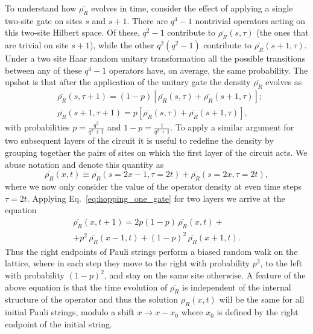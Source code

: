 \documentclass[aps,prb,twocolumn,superscriptaddress]{revtex4-1}
\begin{document}
To understand how $\overline{\rho_R}$ evolves in time, consider the effect of applying a single two-site gate on sites $s$ and $s+1$. There are $q^4-1$ nontrivial operators acting on this two-site Hilbert space. Of these, $q^2-1$ contribute to $\overline{\rho_R}(s,\tau)$ (the ones that are trivial on site $s+1$), while the other $q^2(q^2-1)$ contribute to $\overline{\rho_R}(s+1,\tau)$. Under a two site Haar random unitary transformation all the possible transitions between any of these $q^4-1$ operators have, on average, the same probability\cite{Brown12}. The upshot is that after the application of the unitary gate the density $\overline{\rho_R}$ evolves as
\begin{subequations}\label{eq:hopping_one_gate}
\begin{align}
&\overline{\rho_R}(s,\tau+1) = (1-p) \left[\overline{\rho_R}(s,\tau) + \overline{\rho_R}(s+1,\tau) \right]; \\
&\overline{\rho_R}(s+1,\tau+1) = p \left[\overline{\rho_R}(s,\tau) + \overline{\rho_R}(s+1,\tau) \right],
\end{align}
\end{subequations}
with probabilities $p = \frac{q^2}{q^2+1}$ and $1-p = \frac{1}{q^2+1}$. To apply a similar argument for two subsequent layers of the circuit it is useful to redefine the density by grouping together the pairs of sites on which the first layer of the circuit acts. We abuse notation and denote this quantity as
\begin{equation}\label{eq:newrho}
\overline{\rho_R}(x,t) \equiv  \overline{\rho_R}(s=2x-1,\tau=2t) + \overline{\rho_R}(s=2x,\tau=2t),
\end{equation}
where we now only consider the value of the operator density at even time steps $\tau = 2t$. Applying Eq.~\eqref{eq:hopping_one_gate} for two layers we arrive at the equation 
\begin{multline}\label{eq:random_walk}
\overline{\rho_R}(x,t+1) = 2p(1-p)\,\overline{\rho_R}(x,t) + \\
+ p^2\,\overline{\rho_R}(x-1,t) + (1-p)^2\,\overline{\rho_R}(x+1,t).
\end{multline}
Thus the right endpoints of Pauli strings perform a biased random walk on the lattice, where in each step they move to the right with probability $p^2$, to the left with probability $(1-p)^2$, and stay on the same site otherwise. A feature of the above equation is that the time evolution of $\overline{\rho_R}$ is independent of the internal structure of the operator and thus the solution $\overline{\rho_R}(x,t)$ will be the same for all initial Pauli strings, modulo a shift $x\to x-x_0$ where $x_0$ is defined by the right endpoint of the initial string.
\end{document}
